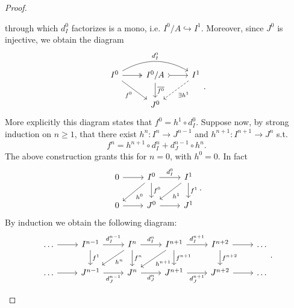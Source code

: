 \documentclass[../Main]{subfiles}
\begin{document}
\begin{proof}
\begin{description}
	through which $d^0_I$ factorizes is a mono, i.e. $I^0/A \hookrightarrow I^1$.
	Moreover, since $J^0$ is injective, we obtain the diagram
	\begin{equation}
	\begin{tikzcd}
		I^0 \arrow[r, "", twoheadrightarrow] \arrow[rd, "f^0"', rightarrow] 
		\arrow[rr, "d_I^0", rightarrow, bend left] &
		I^0/A \arrow[r, "", rightarrowtail]  \arrow[d, "\overline{f^0}", rightarrow] &
		I^1 \arrow[ld, "\exists h^1", dashrightarrow] \\
		&
		J^0
	\end{tikzcd}
	.\end{equation} 
	More explicitly this diagram states that $f^0 = h^1 \circ d_I^0$.
	Suppose now, by strong induction on $n \geq 1$, that there exist
	$h^n\colon I^n \longrightarrow J^{n-1}$
	and
	$h^{n+1}\colon I^{n+1} \longrightarrow J^{n}$
	s.t.
	\begin{equation}
	f^n = h^{n+1} \circ d^n_I + d^{n-1}_J \circ h^n
	.\end{equation} 
	The above construction grants this for $n = 0$, with $h^0 = 0$. In fact
	\begin{equation}
	\begin{tikzcd}
		0 \arrow[r, "", rightarrow] &
		I^0 \arrow[ld, "h^0", rightarrow] \arrow[r, "d^0_I", rightarrow] 
		\arrow[d, "f^0", rightarrow] &
		I^1 \arrow[d, "f^1", rightarrow] 
		\arrow[ld, "h^1", rightarrow] \\
		0 \arrow[r, "", rightarrow] &
		J^0 \arrow[r, "", rightarrow] &
		J^1
	\end{tikzcd}
	.\end{equation} 
	By induction we obtain the following diagram:
	\begin{equation}
	\begin{tikzcd}
		\ldots \arrow[r, "", rightarrow] &
		I^{n-1} \arrow[r, "d^{n-1}_I", rightarrow] 
		\arrow[d, "f^1", rightarrow] &
		I^n \arrow[r, "d^n_I", rightarrow] \arrow[ld, "h^n", rightarrow] 
		\arrow[d, "f^n", rightarrow] &
		I^{n+1} \arrow[d, "f^{n+1}", rightarrow] \arrow[ld, "h^{n+1}", rightarrow] 
		\arrow[r, "d^{n+1}_I", rightarrow] &
		I^{n+2} \arrow[r, "", rightarrow] \arrow[d, "f^{n+2}", rightarrow] &
		\ldots \\
		\ldots \arrow[r, "", rightarrow] &
		J^{n-1} \arrow[r, "d^{n-1}_J"', rightarrow] &
		J^n \arrow[r, "d^n_J"', rightarrow] &
		J^{n+1} \arrow[r, "d^{n+1}_J"', rightarrow] &
		J^{n+2} \arrow[r, "", rightarrow] &
		\ldots
	\end{tikzcd}
	.\end{equation} 

\end{description}
\end{proof}
\end{document}
